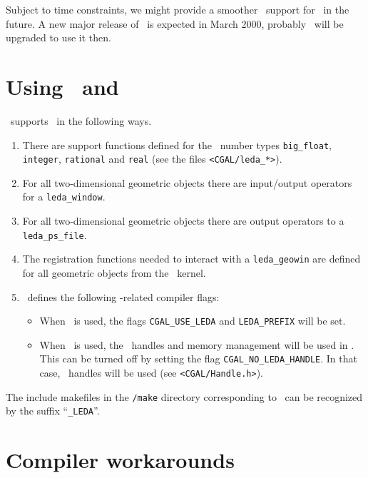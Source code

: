 Subject to time constraints, we might provide a smoother \gmp\ support
for \msvc\ in the future. A new major release of \gmp\ is expected in
March 2000, probably \cgal\ will be upgraded to use it then.

\lcTex{\begin{appendix}}

\section{Using \cgal\ and \leda}\label{sec:leda}
\cgal\ supports \leda\ in the following ways.

\begin{enumerate}
\item There are support functions defined for the \leda\ number types
  \texttt{big\_float}, \texttt{integer}, \texttt{rational} and
  \texttt{real} (see the files \texttt{<CGAL/leda\_*>}).
\item For all two-dimensional geometric objects there are input/output
  operators for a \texttt{leda\_window}.
\item For all two-dimensional geometric objects there are output
  operators to a \texttt{leda\_ps\_file}.
\item The registration functions needed to interact with a
  \texttt{leda\_geowin} are defined for all geometric objects from the
  \cgal\ kernel.
\item \cgal\ defines the following \leda-related compiler flags:
\begin{itemize}
\item When \leda\ is used, the flags \texttt{CGAL\_USE\_LEDA} and
  \texttt{LEDA\_PREFIX} will be set.
\item When \leda\ is used, the \leda\ handles and memory management
  will be used in \cgal.  This can be turned off by setting the flag
  \texttt{CGAL\_NO\_LEDA\_HANDLE}. In that case, \cgal\ handles will
  be used (see \texttt{<CGAL/Handle.h>}).
\end{itemize}
\end{enumerate}

The include makefiles in the \texttt{\cgaldir/make} directory
corresponding to \leda\ can be recognized by the suffix
``\texttt{\_LEDA}''.

\section{Compiler workarounds}

